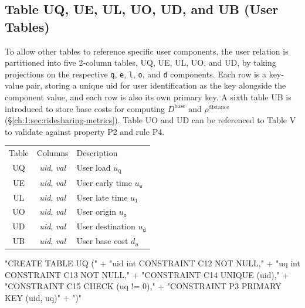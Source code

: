 \subsection{Table UQ, UE, UL, UO, UD, and UB (User Tables)}
To allow other tables to reference specific user components, the user relation
is partitioned into five 2-column tables, UQ, UE, UL, UO, and UD, by taking
projections on the respective \texttt{q}, \texttt{e}, \texttt{l}, \texttt{o},
and \texttt{d} components. Each row is a key-value pair, storing a unique
\textsf{uid} for user identification as the key alongside the component value,
and each row is also its own primary key.  A sixth table UB is introduced to
store base costs for computing $D^\textrm{base}$ and $\rho^\textrm{distance}$
(\S\ref{ch:1:sec:ridesharing-metrics}).  Table UO and UD can be referenced to Table
V to validate against property P2 and rule P4.
\begin{table}[h]
\centering
\small
\begin{tabular}{|c|c|l|}
\hline
\rowcolor{TableTitle}
\multicolumn{3}{|c|}{User Tables}\\
\hline
\rowcolor{TableHeader}
Table & Columns & Description \\
\hline
UQ & \textit{uid}, \textit{val} & User load $u_\texttt{q}$ \\
UE & \textit{uid}, \textit{val} & User early time $u_\texttt{e}$ \\
UL & \textit{uid}, \textit{val} & User late time $u_\texttt{l}$ \\
UO & \textit{uid}, \textit{val} & User origin $u_\texttt{o}$ \\
UD & \textit{uid}, \textit{val} & User destination $u_\texttt{d}$ \\
UB & \textit{uid}, \textit{val} & User base cost $d_u$ \\
\hline
\end{tabular}
\end{table}
\nwenddocs{}\endmoddef{}
"CREATE TABLE UQ ("
  + "uid int  CONSTRAINT C12 NOT NULL,"
  + "uq  int  CONSTRAINT C13 NOT NULL,"
  + "CONSTRAINT C14 UNIQUE (uid),"
  + "CONSTRAINT C15 CHECK (uq != 0),"
  + "CONSTRAINT P3 PRIMARY KEY (uid, uq)"
  + ")"
\nwendcode{}\nwdocspar
\nwenddocs{}\endmoddef{}
